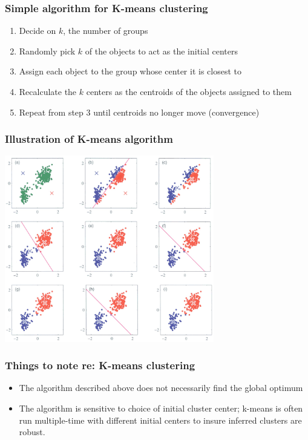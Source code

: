 \documentclass{beamer}
\begin{document}
\begin{frame}
\frametitle{Simple algorithm for K-means clustering}
\begin{enumerate}
\item Decide on $k$, the number of groups

\item Randomly pick $k$ of the objects to act as the initial centers

\item Assign each object to the group whose center it is closest to

\item Recalculate the $k$ centers as the centroids of the objects assigned to them

\item Repeat from step 3 until centroids no longer move (convergence)

\end{enumerate}
\end{frame}

\begin{frame}
\frametitle{Illustration of K-means algorithm}
\begin{center}
\includegraphics[height=3.2in]{k-means-fig.jpg}    
\end{center}
\end{frame}

\begin{frame}
\frametitle{Things to note re: K-means clustering}
\begin{itemize}
\item The algorithm described above does not necessarily find the global optimum

\bigskip

\item The algorithm is sensitive to choice of initial cluster center; k-means is often run multiple-time with different initial centers to insure inferred clusters are robust.    
\end{itemize}
\end{frame}
\end{document}
